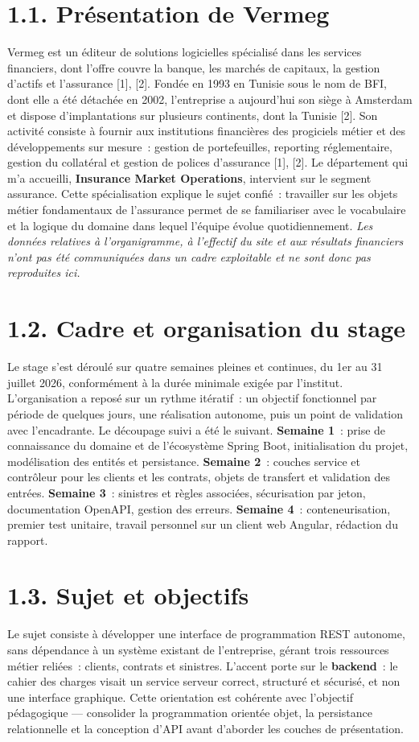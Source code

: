 \documentclass[12pt,a4paper]{report}
\begin{document}
\section*{1.1. Présentation de Vermeg}
Vermeg est un éditeur de solutions logicielles spécialisé dans les services financiers, dont l'offre couvre la banque, les marchés de capitaux, la gestion d'actifs et l'assurance [1], [2]. Fondée en 1993 en Tunisie sous le nom de BFI, dont elle a été détachée en 2002, l'entreprise a aujourd'hui son siège à Amsterdam et dispose d'implantations sur plusieurs continents, dont la Tunisie [2]. Son activité consiste à fournir aux institutions financières des progiciels métier et des développements sur mesure~: gestion de portefeuilles, reporting réglementaire, gestion du collatéral et gestion de polices d'assurance [1], [2].
Le département qui m'a accueilli, \textbf{Insurance Market Operations}, intervient sur le segment assurance. Cette spécialisation explique le sujet confié~: travailler sur les objets métier fondamentaux de l'assurance permet de se familiariser avec le vocabulaire et la logique du domaine dans lequel l'équipe évolue quotidiennement.
\textit{Les données relatives à l'organigramme, à l'effectif du site et aux résultats financiers n'ont pas été communiquées dans un cadre exploitable et ne sont donc pas reproduites ici.}
\section*{1.2. Cadre et organisation du stage}
Le stage s'est déroulé sur quatre semaines pleines et continues, du 1er au 31 juillet 2026, conformément à la durée minimale exigée par l'institut. L'organisation a reposé sur un rythme itératif~: un objectif fonctionnel par période de quelques jours, une réalisation autonome, puis un point de validation avec l'encadrante. Le découpage suivi a été le suivant.
\textbf{Semaine 1}~: prise de connaissance du domaine et de l'écosystème Spring Boot, initialisation du projet, modélisation des entités et persistance. \textbf{Semaine 2}~: couches service et contrôleur pour les clients et les contrats, objets de transfert et validation des entrées. \textbf{Semaine 3}~: sinistres et règles associées, sécurisation par jeton, documentation OpenAPI, gestion des erreurs. \textbf{Semaine 4}~: conteneurisation, premier test unitaire, travail personnel sur un client web Angular, rédaction du rapport.
\section*{1.3. Sujet et objectifs}
Le sujet consiste à développer une interface de programmation REST autonome, sans dépendance à un système existant de l'entreprise, gérant trois ressources métier reliées~: clients, contrats et sinistres. L'accent porte sur le \textbf{backend}~: le cahier des charges visait un service serveur correct, structuré et sécurisé, et non une interface graphique. Cette orientation est cohérente avec l'objectif pédagogique — consolider la programmation orientée objet, la persistance relationnelle et la conception d'API avant d'aborder les couches de présentation.
\end{document}

